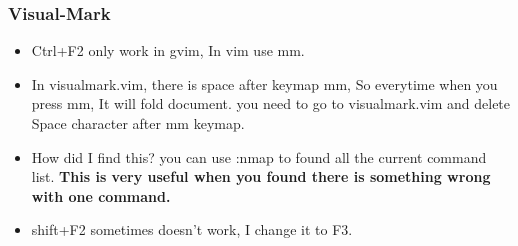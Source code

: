 \documentclass[a4paper,11pt,twoside]{book}
\begin{document}
\subsubsection{Visual-Mark}
\begin{itemize}
		\item Ctrl+F2 only work in gvim, In vim use mm.

		\item In visualmark.vim, there is space after keymap mm, So everytime when you press mm, It will fold document. you need to go to visualmark.vim and delete Space character after mm keymap.

		\item How did I find this? you can use :nmap to found all the current command list. \textbf{This is very useful when you found there is something wrong with one command.}

		\item shift+F2 sometimes doesn't work, I change it to F3. 
				
\end{itemize}
\end{document}
